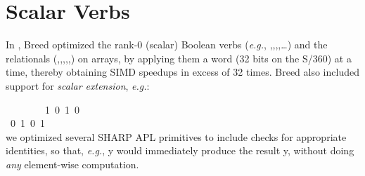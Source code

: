 \section{Scalar Verbs}

In \ibmapl, Breed optimized the rank-0 (scalar) 
Boolean verbs ({\em e.g.}, 
{\apl \qand,\qor,\qtilde,\qnand,\qnor\dots})
and the relationals ({\apl \qlt,\qle,\qeq,\qge,\qgt,\qne})
on arrays, by applying them a word (32 bits on the S/360)
at a time, thereby obtaining SIMD speedups in excess of 32 times.
Breed also included support for {\em scalar extension}, 
{\em e.g.}:

~~~~~~~{\qne{}~1~0~1~0} \\
{~0~1~0~1}\\


\noindent we optimized several SHARP APL primitives to 
include checks for appropriate identities, so that, {\em e.g.}, 
{\qand\0y} would immediately produce the result {\apl y}, 
without doing {\em any} element-wise computation.

